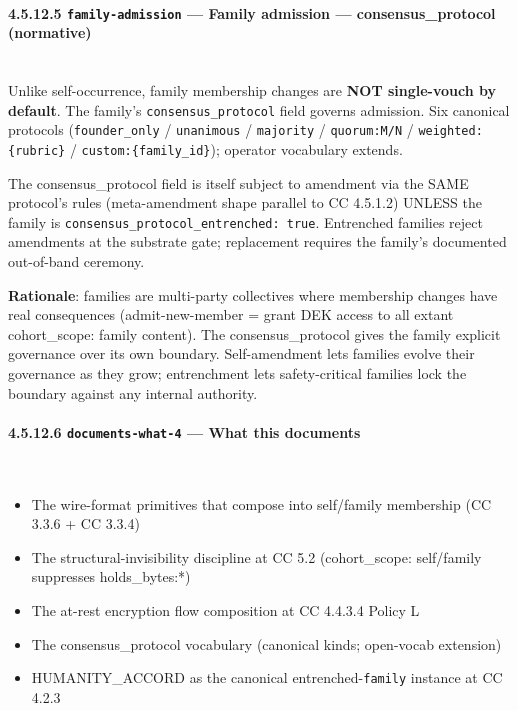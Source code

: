 \documentclass[11pt]{article}
\begin{document}
\paragraph{4.5.12.5 \texttt{family-admission} — Family admission — consensus\_protocol (normative)}\mbox{}\\


Unlike self-occurrence, family membership changes are \textbf{NOT single-vouch by default}. The family's \texttt{consensus\_protocol} field governs admission. Six canonical protocols (\texttt{founder\_only} / \texttt{unanimous} / \texttt{majority} / \texttt{quorum:M/N} / \texttt{weighted:\{rubric\}} / \texttt{custom:\{family\_id\}}); operator vocabulary extends.


The consensus\_protocol field is itself subject to amendment via the SAME protocol's rules (meta-amendment shape parallel to CC 4.5.1.2) UNLESS the family is \texttt{consensus\_protocol\_entrenched: true}. Entrenched families reject amendments at the substrate gate; replacement requires the family's documented out-of-band ceremony.


\textbf{Rationale}: families are multi-party collectives where membership changes have real consequences (admit-new-member = grant DEK access to all extant cohort\_scope: family content). The consensus\_protocol gives the family explicit governance over its own boundary. Self-amendment lets families evolve their governance as they grow; entrenchment lets safety-critical families lock the boundary against any internal authority.


\paragraph{4.5.12.6 \texttt{documents-what-4} — What this documents}\mbox{}\\


\begin{itemize}\setlength\itemsep{0pt}
\item The wire-format primitives that compose into self/family membership (CC 3.3.6 + CC 3.3.4)
\item The structural-invisibility discipline at CC 5.2 (cohort\_scope: self/family suppresses holds\_bytes:*)
\item The at-rest encryption flow composition at CC 4.4.3.4 Policy L
\item The consensus\_protocol vocabulary (canonical kinds; open-vocab extension)
\item HUMANITY\_ACCORD as the canonical entrenched-\texttt{family} instance at CC 4.2.3
\end{itemize}
\end{document}
